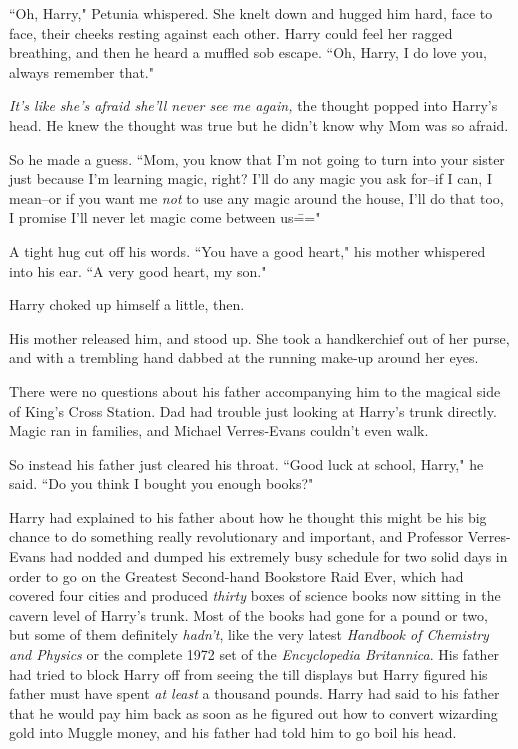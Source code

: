 ``Oh, Harry," Petunia whispered. She knelt down and hugged him hard, face to face, their cheeks resting against each other. Harry could feel her ragged breathing, and then he heard a muffled sob escape. ``Oh, Harry, I do love you, always remember that."

\emph{It's like she's afraid she'll never see me again,} the thought popped into Harry's head. He knew the thought was true but he didn't know why Mom was so afraid.

So he made a guess. ``Mom, you know that I'm not going to turn into your sister just because I'm learning magic, right? I'll do any magic you ask for\---if I can, I mean\---or if you want me \emph{not} to use any magic around the house, I'll do that too, I promise I'll never let magic come between us\==="

A tight hug cut off his words. ``You have a good heart," his mother whispered into his ear. ``A very good heart, my son."

Harry choked up himself a little, then.

His mother released him, and stood up. She took a handkerchief out of her purse, and with a trembling hand dabbed at the running make-up around her eyes.

There were no questions about his father accompanying him to the magical side of King's Cross Station. Dad had trouble just looking at Harry's trunk directly. Magic ran in families, and Michael Verres-Evans couldn't even walk.

So instead his father just cleared his throat. ``Good luck at school, Harry," he said. ``Do you think I bought you enough books?"

Harry had explained to his father about how he thought this might be his big chance to do something really revolutionary and important, and Professor Verres-Evans had nodded and dumped his extremely busy schedule for two solid days in order to go on the Greatest Second-hand Bookstore Raid Ever, which had covered four cities and produced \emph{thirty} boxes of science books now sitting in the cavern level of Harry's trunk. Most of the books had gone for a pound or two, but some of them definitely \emph{hadn't}, like the very latest \emph{Handbook of Chemistry and Physics} or the complete 1972 set of the \emph{Encyclopedia Britannica}. His father had tried to block Harry off from seeing the till displays but Harry figured his father must have spent \emph{at least} a thousand pounds. Harry had said to his father that he would pay him back as soon as he figured out how to convert wizarding gold into Muggle money, and his father had told him to go boil his head.


